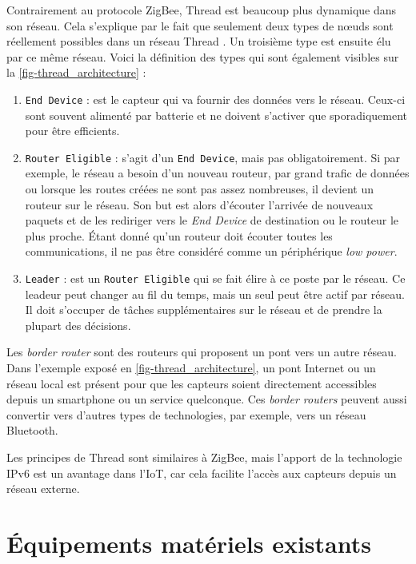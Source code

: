 Contrairement au protocole ZigBee, Thread est beaucoup plus dynamique dans son réseau. Cela s'explique par le fait que seulement deux types de n\oe uds sont réellement possibles dans un réseau Thread \cite{Sevenkey87:online}. Un troisième type est ensuite élu par ce même réseau. Voici la définition des types qui sont également visibles sur la \cref{fig-thread_architecture} : 

\begin{enumerate}
    \item \texttt{End Device} : est le capteur qui va fournir des données vers le réseau. Ceux-ci sont souvent alimenté par batterie et ne doivent s'activer que sporadiquement pour être efficients. 
    \item \texttt{Router Eligible} : s'agit d'un \texttt{End Device}, mais pas obligatoirement. Si par exemple, le réseau a besoin d'un nouveau routeur, par grand trafic de données ou lorsque les routes créées ne sont pas assez nombreuses, il devient un routeur sur le réseau. Son but est alors d'écouter l'arrivée de nouveaux paquets et de les rediriger vers le \textit{End Device} de destination ou le routeur le plus proche. Étant donné qu'un routeur doit écouter toutes les communications, il ne pas être considéré comme un périphérique \textit{low power}.
    \item \texttt{Leader} : est un \texttt{Router Eligible} qui se fait élire à ce poste par le réseau. Ce leadeur peut changer au fil du temps, mais un seul peut être actif par réseau. Il doit s'occuper de tâches supplémentaires sur le réseau et de prendre la plupart des décisions.
\end{enumerate}


Les\textit{ border router} sont des routeurs qui proposent un pont vers un autre réseau. Dans l'exemple exposé en \cref{fig-thread_architecture}, un pont Internet ou un réseau local est présent pour que les capteurs soient directement accessibles depuis un smartphone ou un service quelconque. Ces \textit{border routers} peuvent aussi convertir vers d'autres types de technologies, par exemple, vers un réseau Bluetooth.


Les principes de Thread sont similaires à ZigBee, mais l'apport de la technologie IPv6 est un avantage dans l'IoT, car cela facilite l'accès aux capteurs depuis un réseau externe.


\section{Équipements matériels existants}




